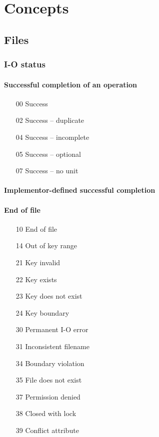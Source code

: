 \section{Concepts}

\subsection{Files}

\subsubsection{I-O status}

\paragraph{Successful completion of an operation}
\begin{enumerate}
\item[00] Success
\item[02] Success -- duplicate
\item[04] Success -- incomplete
\item[05] Success -- optional
\item[07] Success -- no unit
\end{enumerate}

\paragraph{Implementor-defined successful completion}
\paragraph{End of file}
\begin{enumerate}
\item[10] End of file
\item[14] Out of key range
\end{enumerate}

\begin{enumerate}
\item[21] Key invalid
\item[22] Key exists
\item[23] Key does not exist
\item[24] Key boundary
\end{enumerate}

\begin{enumerate}
\item[30] Permanent I-O error
\item[31] Inconsistent filename
\item[34] Boundary violation
\item[35] File does not exist
\item[37] Permission denied
\item[38] Closed with lock
\item[39] Conflict attribute
\end{enumerate}

